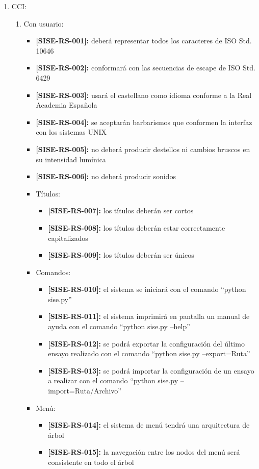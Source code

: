 \documentclass[
11pt, %
codirector, %
]{charter}
\def\codigo{SISE-RS}
\newcommand{\req}[1]{\textbf{[\codigo-#1]:}}
\begin{document}
\begin{enumerate}
	\item CCI:
		\begin{enumerate}
			\item Con usuario:
				\begin{itemize}
					\item \req{001} deberá representar todos los caracteres de ISO Std. 10646
					\item \req{002} conformará con las secuencias de escape de ISO Std. 6429
					\item \req{003} usará el castellano como idioma conforme a la Real Academia Española
					\item \req{004} se aceptarán barbarismos que conformen la interfaz con los sistemas UNIX
					\item \req{005} no deberá producir destellos ni cambios bruscos en su intensidad lumínica
					\item \req{006} no deberá producir sonidos
					\item Títulos:
						\begin{itemize}
							\item \req{007} los títulos deberán ser cortos
							\item \req{008} los títulos deberán estar correctamente capitalizados
							\item \req{009} los títulos deberán ser únicos
						\end{itemize}
					\item Comandos:
						\begin{itemize}
							\item \req{010} el sistema se iniciará con el comando ``python sise.py''
							\item \req{011} el sistema imprimirá en pantalla un manual de ayuda con el comando ``python sise.py --help''
							\item \req{012} se podrá exportar la configuración del último ensayo realizado con el comando ``python sise.py --export=Ruta''
							\item \req{013} se podrá importar la configuración de un ensayo a realizar con el comando ``python sise.py --import=Ruta/Archivo''
						\end{itemize}
					\item Menú:
						\begin{itemize}
							\item \req{014} el sistema de menú tendrá una arquitectura de árbol
							\item \req{015} la navegación entre los nodos del menú será consistente en todo el árbol

\end{itemize}
\end{itemize}
\end{enumerate}
\end{enumerate}
\end{document}
